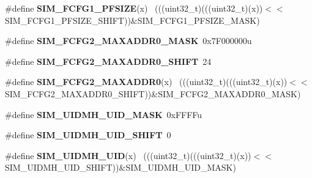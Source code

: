 \begin{DoxyCompactItemize}
\item 
\hypertarget{group___s_i_m___register___masks_ga5d75d9b0aaf8e1b69da9820bf13ec183}{}\#define {\bfseries S\+I\+M\+\_\+\+F\+C\+F\+G1\+\_\+\+P\+F\+S\+I\+Z\+E}(x)                                        ~(((uint32\+\_\+t)(((uint32\+\_\+t)(x))$<$$<$S\+I\+M\+\_\+\+F\+C\+F\+G1\+\_\+\+P\+F\+S\+I\+Z\+E\+\_\+\+S\+H\+I\+F\+T))\&S\+I\+M\+\_\+\+F\+C\+F\+G1\+\_\+\+P\+F\+S\+I\+Z\+E\+\_\+\+M\+A\+S\+K)\label{group___s_i_m___register___masks_ga5d75d9b0aaf8e1b69da9820bf13ec183}

\item 
\hypertarget{group___s_i_m___register___masks_gad1096c0a75d0bf4dfc93f4b1957fe493}{}\#define {\bfseries S\+I\+M\+\_\+\+F\+C\+F\+G2\+\_\+\+M\+A\+X\+A\+D\+D\+R0\+\_\+\+M\+A\+S\+K}~0x7\+F000000u\label{group___s_i_m___register___masks_gad1096c0a75d0bf4dfc93f4b1957fe493}

\item 
\hypertarget{group___s_i_m___register___masks_ga3ccb8fde0ef2e170d0c84cdfa3651d34}{}\#define {\bfseries S\+I\+M\+\_\+\+F\+C\+F\+G2\+\_\+\+M\+A\+X\+A\+D\+D\+R0\+\_\+\+S\+H\+I\+F\+T}~24\label{group___s_i_m___register___masks_ga3ccb8fde0ef2e170d0c84cdfa3651d34}

\item 
\hypertarget{group___s_i_m___register___masks_gaba3b670134023f4c71398fd21f4ba0fe}{}\#define {\bfseries S\+I\+M\+\_\+\+F\+C\+F\+G2\+\_\+\+M\+A\+X\+A\+D\+D\+R0}(x)                                    ~(((uint32\+\_\+t)(((uint32\+\_\+t)(x))$<$$<$S\+I\+M\+\_\+\+F\+C\+F\+G2\+\_\+\+M\+A\+X\+A\+D\+D\+R0\+\_\+\+S\+H\+I\+F\+T))\&S\+I\+M\+\_\+\+F\+C\+F\+G2\+\_\+\+M\+A\+X\+A\+D\+D\+R0\+\_\+\+M\+A\+S\+K)\label{group___s_i_m___register___masks_gaba3b670134023f4c71398fd21f4ba0fe}

\item 
\hypertarget{group___s_i_m___register___masks_ga38dffcb27b09a015e2f2e7812d42477c}{}\#define {\bfseries S\+I\+M\+\_\+\+U\+I\+D\+M\+H\+\_\+\+U\+I\+D\+\_\+\+M\+A\+S\+K}~0x\+F\+F\+F\+Fu\label{group___s_i_m___register___masks_ga38dffcb27b09a015e2f2e7812d42477c}

\item 
\hypertarget{group___s_i_m___register___masks_ga56b83da182908eb5c406181b72870e54}{}\#define {\bfseries S\+I\+M\+\_\+\+U\+I\+D\+M\+H\+\_\+\+U\+I\+D\+\_\+\+S\+H\+I\+F\+T}~0\label{group___s_i_m___register___masks_ga56b83da182908eb5c406181b72870e54}

\item 
\hypertarget{group___s_i_m___register___masks_gab8c2021ee119a8badd1b3767547274f7}{}\#define {\bfseries S\+I\+M\+\_\+\+U\+I\+D\+M\+H\+\_\+\+U\+I\+D}(x)                                              ~(((uint32\+\_\+t)(((uint32\+\_\+t)(x))$<$$<$S\+I\+M\+\_\+\+U\+I\+D\+M\+H\+\_\+\+U\+I\+D\+\_\+\+S\+H\+I\+F\+T))\&S\+I\+M\+\_\+\+U\+I\+D\+M\+H\+\_\+\+U\+I\+D\+\_\+\+M\+A\+S\+K)\label{group___s_i_m___register___masks_gab8c2021ee119a8badd1b3767547274f7}


\end{DoxyCompactItemize}
